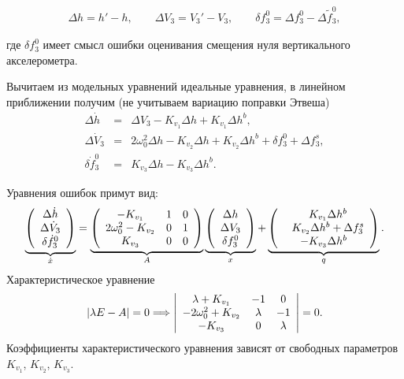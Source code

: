 \documentclass[a4paper,14pt]{article}
\theoremstyle{plain} %
\theoremstyle{definition} %
\theoremstyle{remark} %
\begin{document}
\begin{eqnarray*}
    \Delta h  = h' - h, \qquad \Delta V_3 = V_3' - V_3, \qquad \delta f_3^0 = \Delta f_3^0 - \Delta {\widetilde f}_3^0,
\end{eqnarray*}

где $\delta f_3^0$ имеет смысл ошибки оценивания смещения нуля вертикального акселерометра.

Вычитаем из модельных уравнений идеальные уравнения, в линейном приближении получим (не учитываем вариацию поправки Этвеша)
\begin{eqnarray*}
    \Delta \dot  h  &=& \Delta V_3 - K_{v_1} \Delta h + K_{v_1} \Delta h^b , \nonumber \\
    \Delta \dot V_3  &=&  2 \omega_0^2 \Delta h - K_{v_2} \Delta h + K_{v_2} \Delta h^b + \delta f_3^0 + \Delta f_3^s , \nonumber \\
    \delta {\dot f}_3^0   &=&  K_{v_3} \Delta h - K_{v_3} \Delta h^b
    .
\end{eqnarray*}

Уравнения ошибок примут вид:
\begin{eqnarray*}
    \underbrace{
        \left(
        \begin{array}{c}
            \Delta \dot h \cr
            \Delta \dot V_3 \cr
            \delta {\dot f}_3^0
        \end{array}
        \right)}_{\dot x}
    =
    \underbrace{
        \left(
        \begin{array}{ccc}
            - K_{v_1}             & 1 & 0  \cr
            2\omega_0^2 - K_{v_2} & 0 & 1  \cr
            K_{v_3}               & 0 & 0
        \end{array}
        \right)
    }_{A}
    \underbrace{
        \left(
        \begin{array}{c}
            \Delta h \cr
            \Delta V_3 \cr
            \delta f_3^0
        \end{array}
        \right)
    }_{x}
    +
    \underbrace{
        \left(
        \begin{array}{c}
            \phantom{-} K_{v_1} \Delta h^b \cr
            \phantom{-} K_{v_2} \Delta h^b + \Delta f_3^s \cr
            -K_{v_3} \Delta h^b
        \end{array}
        \right)
    }_{q}
    .
\end{eqnarray*}
Характеристическое уравнение
\begin{eqnarray*}
    \left| \lambda E- A \right| = 0  \Longrightarrow
    \left|
    \begin{array}{ccc}
        \lambda  + K_{v_1}     & -1      & 0 \cr
        -2\omega_0^2 + K_{v_2} & \lambda & -1 \cr
        - K_{v_3}              & 0       & \lambda
    \end{array}
    \right| = 0 .
\end{eqnarray*}
Коэффициенты характеристического уравнения зависят от свободных параметров $K_{v_1}$, $K_{v_2}$, $K_{v_3}$.
\end{document}
